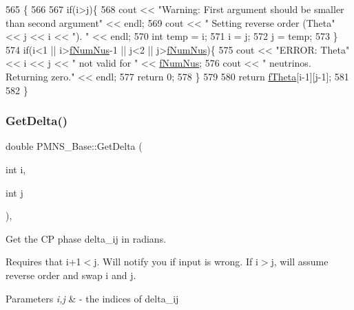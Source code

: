 \begin{DoxyCode}
565 \{
566 
567   \textcolor{keywordflow}{if}(i>j)\{
568     cout << \textcolor{stringliteral}{"Warning: First argument should be smaller than second argument"} << endl;
569     cout << \textcolor{stringliteral}{"         Setting reverse order (Theta"} << j << i << \textcolor{stringliteral}{"). "} << endl;
570     \textcolor{keywordtype}{int} temp = i;
571     i = j;
572     j = temp;
573   \}
574   \textcolor{keywordflow}{if}(i<1 || i>\hyperlink{classOscProb_1_1PMNS__Base_a24bb74bed63569dfe88b18fa6a08060e}{fNumNus}-1 || j<2 || j>\hyperlink{classOscProb_1_1PMNS__Base_a24bb74bed63569dfe88b18fa6a08060e}{fNumNus})\{
575     cout << \textcolor{stringliteral}{"ERROR: Theta"} << i << j << \textcolor{stringliteral}{" not valid for "} << \hyperlink{classOscProb_1_1PMNS__Base_a24bb74bed63569dfe88b18fa6a08060e}{fNumNus};
576     cout << \textcolor{stringliteral}{" neutrinos. Returning zero."} << endl;
577     \textcolor{keywordflow}{return} 0;
578   \}
579 
580   \textcolor{keywordflow}{return} \hyperlink{classOscProb_1_1PMNS__Base_a1976887cd658dd86b2336c181f1470b4}{fTheta}[i-1][j-1];
581 
582 \}
\end{DoxyCode}
\mbox{\label{classOscProb_1_1PMNS__Base_adb8dbc91d4286d2e7c8f768c59476241}} 
\subsubsection{\texorpdfstring{Get\+Delta()}{GetDelta()}}
{\footnotesize\ttfamily double P\+M\+N\+S\+\_\+\+Base\+::\+Get\+Delta (\begin{DoxyParamCaption}\item[{int}]{i,  }\item[{int}]{j }\end{DoxyParamCaption})\hspace{0.3cm}{\ttfamily [virtual]}, {\ttfamily [inherited]}}

Get the CP phase delta\+\_\+ij in radians.

Requires that i+1$<$j. Will notify you if input is wrong. If i$>$j, will assume reverse order and swap i and j.


\begin{DoxyParams}{Parameters}
{\em i,j} & -\/ the indices of delta\+\_\+ij \\
\hline
\end{DoxyParams}


